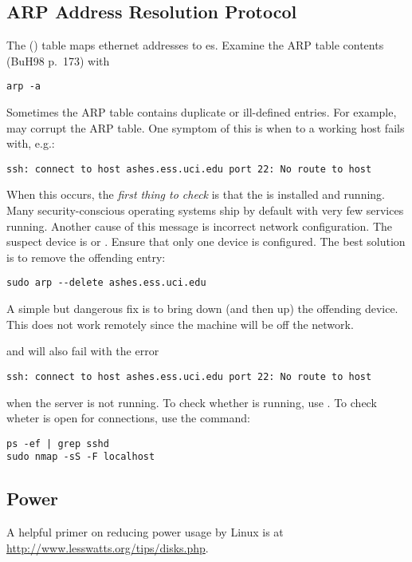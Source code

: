 \documentclass[12pt,twoside]{article}
\begin{document}
\subsection{ARP Address Resolution Protocol}\label{sxn:arp}
The  () table maps
ethernet addresses to es. 
Examine the ARP table contents (BuH98 p.~173) with
\begin{verbatim}
arp -a 
\end{verbatim}

Sometimes the ARP table contains duplicate or ill-defined entries.
For example,  may corrupt the ARP table.
One symptom of this is when  to a working host fails with,
e.g.:
\begin{verbatim}
ssh: connect to host ashes.ess.uci.edu port 22: No route to host
\end{verbatim}
When this occurs, the \textit{first thing to check} is that the
  is installed and running.
Many security-conscious operating systems ship by default with 
very few services running.
Another cause of this message is incorrect network configuration.
The suspect device is  or .
Ensure that only one  device is configured.
The best solution is to remove the offending entry: 
\begin{verbatim}
sudo arp --delete ashes.ess.uci.edu
\end{verbatim}
A simple but dangerous fix is to bring down (and then up) the
offending device. 
This does not work remotely since the machine will be off the
network. 

 and  will also fail with the error
\begin{verbatim}
ssh: connect to host ashes.ess.uci.edu port 22: No route to host
\end{verbatim}
when the  server is not running.
To check whether  is running, use .
To check wheter  is open for  connections,
use the  command:
\begin{verbatim}
ps -ef | grep sshd
sudo nmap -sS -F localhost
\end{verbatim}

\subsection{Power}\label{sxn:power}
A helpful primer on reducing power usage by Linux is at
\url{http://www.lesswatts.org/tips/disks.php}.
\end{document}
